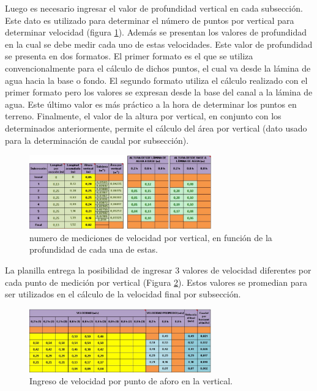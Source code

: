 \documentclass[]{article}
\begin{document}
Luego es necesario ingresar el valor de profundidad vertical en cada subsección. Este dato es utilizado para determinar el número de puntos por vertical para determinar velocidad (figura \ref{pto_vert}). Además se presentan los valores de profundidad en la cual se debe medir cada uno de estas velocidades. Este valor de profundidad se presenta en dos formatos. El primer formato es el que se utiliza convencionalmente para el cálculo de dichos puntos, el cual va desde la lámina de agua hacia la base o fondo. El segundo formato utiliza el cálculo realizado con el primer formato pero los valores se expresan desde la base del canal a la lámina de agua. Este último valor es más práctico a la hora de determinar los puntos en terreno. Finalmente, el valor de la altura por vertical, en conjunto con los determinados anteriormente, permite el cálculo del área por vertical (dato usado para la determinación de caudal por subsección). 

\begin{figure}[h]
\centering
\includegraphics[width=0.7\textwidth]{images/puntos_vertical.eps}
\caption{numero de mediciones de velocidad por vertical, en función de la profundidad de cada una de estas.}
\label{pto_vert}
\end{figure}

La planilla entrega la posibilidad de ingresar 3 valores de velocidad diferentes por cada punto de medición por vertical (Figura \ref{ing_veloc}). Estos valores se promedian para ser utilizados en el cálculo de la velocidad final por subsección.

 \begin{figure}[h]
\centering
\includegraphics[width=0.7\textwidth]{images/ingreso_veloc.eps}
\caption{Ingreso de velocidad por punto de aforo en la vertical.}
\label{ing_veloc}
\end{figure}
\end{document}
